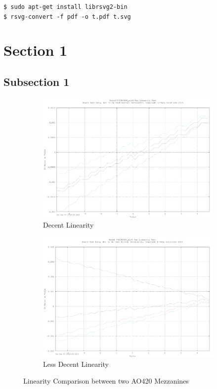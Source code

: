 \documentclass[]{article}
\begin{document}
\begin{verbatim}
$ sudo apt-get install librsvg2-bin
$ rsvg-convert -f pdf -o t.pdf t.svg
\end{verbatim}

\section{Section 1}
\lipsum[1-2]
\subsection{Subsection 1}
\lipsum[1-2]

\begin{figure}[h]
	\begin{subfigure}{0.5\textwidth}
		\includegraphics[width=0.9\linewidth]{images/F42000068_gain0_RAW_Linearity_Test}
		\caption{Decent Linearity}
		\label{fig:goodlin}
	\end{subfigure}
	\begin{subfigure}{0.5\textwidth}
		\includegraphics[width=0.9\linewidth]{images/F42000052_gain0_RAW_Linearity_Test}
		\caption{Less Decent Linearity}
		\label{fig:badlin}
	\end{subfigure}
	
	\caption{Linearity Comparison between two AO420 Mezzanines}
	\label{fig:complin}
\end{figure}
\end{document}

